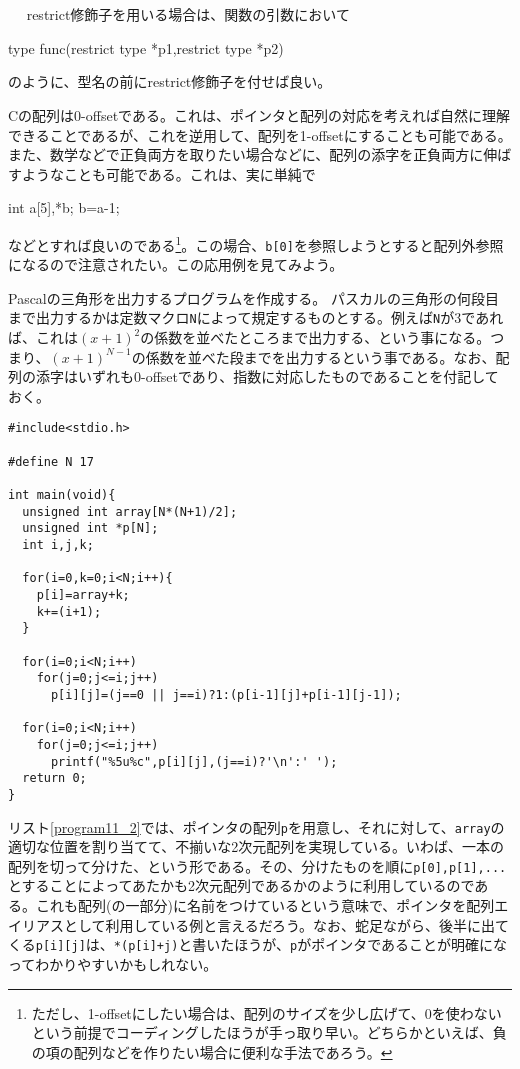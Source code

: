 \\ \\　
restrict修飾子を用いる場合は、関数の引数において
\begin{code}
type func(restrict type *p1,restrict type *p2)
\end{code}
のように、型名の前にrestrict修飾子を付せば良い。

Cの配列は0-offsetである。これは、ポインタと配列の対応を考えれば自然に理解できることであるが、これを逆用して、配列を1-offsetにすることも可能である。また、数学などで正負両方を取りたい場合などに、配列の添字を正負両方に伸ばすようなことも可能である。これは、実に単純で
\begin{code}
int a[5],*b;
b=a-1;
\end{code}
などとすれば良いのである\footnote{ただし、1-offsetにしたい場合は、配列のサイズを少し広げて、0を使わないという前提でコーディングしたほうが手っ取り早い。どちらかといえば、負の項の配列などを作りたい場合に便利な手法であろう。}。この場合、\verb|b[0]|を参照しようとすると配列外参照になるので注意されたい。この応用例を見てみよう。
\begin{boxnote}
Pascalの三角形を出力するプログラムを作成する。
パスカルの三角形の何段目まで出力するかは定数マクロ\verb|N|によって規定するものとする。例えば\verb|N|が3であれば、これは$(x+1)^2$の係数を並べたところまで出力する、という事になる。つまり、$(x+1)^{N-1}$の係数を並べた段までを出力するという事である。なお、配列の添字はいずれも0-offsetであり、指数に対応したものであることを付記しておく。
\end{boxnote}
\begin{boxnote}
\begin{lstlisting}[caption=Pascalの三角形,label=program11_2]
#include<stdio.h>

#define N 17

int main(void){
  unsigned int array[N*(N+1)/2];
  unsigned int *p[N];
  int i,j,k;

  for(i=0,k=0;i<N;i++){
    p[i]=array+k;
    k+=(i+1);
  }

  for(i=0;i<N;i++)
    for(j=0;j<=i;j++)
      p[i][j]=(j==0 || j==i)?1:(p[i-1][j]+p[i-1][j-1]);

  for(i=0;i<N;i++)
    for(j=0;j<=i;j++)
      printf("%5u%c",p[i][j],(j==i)?'\n':' ');
  return 0;
}
\end{lstlisting}
\end{boxnote}

リスト\ref{program11_2}では、ポインタの配列\verb|p|を用意し、それに対して、\verb|array|の適切な位置を割り当てて、不揃いな2次元配列を実現している。いわば、一本の配列を切って分けた、という形である。その、分けたものを順に\verb|p[0],p[1],...|とすることによってあたかも2次元配列であるかのように利用しているのである。これも配列(の一部分)に名前をつけているという意味で、ポインタを配列エイリアスとして利用している例と言えるだろう。なお、蛇足ながら、後半に出てくる\verb|p[i][j]|は、\verb|*(p[i]+j)|と書いたほうが、\verb|p|がポインタであることが明確になってわかりやすいかもしれない。

